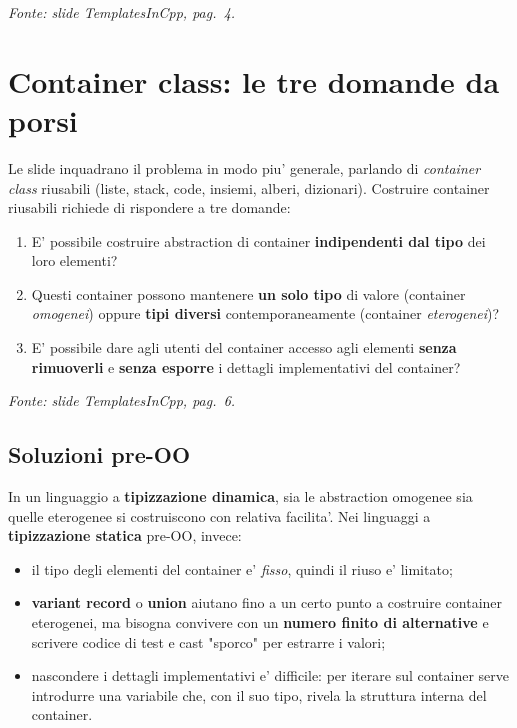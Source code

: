 \documentclass{report}
\newcommand{\fonteslide}[1]{{\footnotesize\itshape\color{gray} Fonte: slide \emph{TemplatesInCpp}, pag.~#1.\par}}
\begin{document}

\fonteslide{4}

\section{Container class: le tre domande da porsi}

Le slide inquadrano il problema in modo piu' generale, parlando di
\emph{container class} riusabili (liste, stack, code, insiemi, alberi,
dizionari). Costruire container riusabili richiede di rispondere a tre
domande:

\begin{enumerate}
    \item E' possibile costruire abstraction di container \textbf{indipendenti
          dal tipo} dei loro elementi?
    \item Questi container possono mantenere \textbf{un solo tipo} di valore
          (container \emph{omogenei}) oppure \textbf{tipi diversi}
          contemporaneamente (container \emph{eterogenei})?
    \item E' possibile dare agli utenti del container accesso agli elementi
          \textbf{senza rimuoverli} e \textbf{senza esporre} i dettagli
          implementativi del container?
\end{enumerate}

\fonteslide{6}

\subsection{Soluzioni pre-OO}

In un linguaggio a \textbf{tipizzazione dinamica}, sia le abstraction
omogenee sia quelle eterogenee si costruiscono con relativa facilita'. Nei
linguaggi a \textbf{tipizzazione statica} pre-OO, invece:

\begin{itemize}
    \item il tipo degli elementi del container e' \emph{fisso}, quindi il
          riuso e' limitato;
    \item \textbf{variant record} o \textbf{union} aiutano fino a un certo
          punto a costruire container eterogenei, ma bisogna convivere con un
          \textbf{numero finito di alternative} e scrivere codice di test e
          cast "sporco" per estrarre i valori;
    \item nascondere i dettagli implementativi e' difficile: per iterare sul
          container serve introdurre una variabile che, con il suo tipo,
          rivela la struttura interna del container.
\end{itemize}
\end{document}
